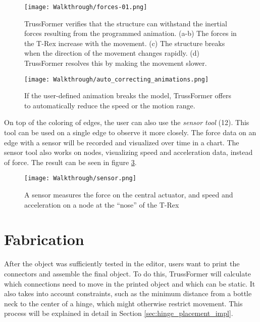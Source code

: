 \begin{figure}[ht!]
    \texttt{[image: Walkthrough/forces-01.png]}
    \centering
    \caption{TrussFormer verifies that the structure can withstand the inertial forces resulting from the programmed animation. (a-b) The forces in the T-Rex increase with the movement. (c) The structure breaks when the direction of the movement changes rapidly. (d) TrussFormer resolves this by making the movement slower.}
    \label{fig:fix_breaking}
\end{figure}
\begin{figure}[ht!]
    \texttt{[image: Walkthrough/auto\_correcting\_animations.png]}
    \centering
    \caption{If the user-defined animation breaks the model, TrussFormer offers to automatically reduce the speed or the motion range.}
    \label{fig:correcting_animation}
\end{figure}

On top of the coloring of edges, the user can also use the \textit{sensor tool} (12). This tool can be used on a single edge to observe it more closely. The force data on an edge with a sensor will be recorded and visualized over time in a chart. The sensor tool also works on nodes, visualizing speed and acceleration data, instead of force. The result can be seen in figure \ref{fig:sensor}.\\
\begin{figure}[ht!]
    \texttt{[image: Walkthrough/sensor.png]}
    \centering
    \caption{A sensor measures the force on the central actuator, and speed and acceleration on a node at the ``nose'' of the T-Rex}
    \label{fig:sensor}
\end{figure}

\section{Fabrication}
After the object was sufficiently tested in the editor, users want to print the connectors and assemble the final object. To do this, TrussFormer will calculate which connections need to move in the printed object and which can be static. It also takes into account constraints, such as the minimum distance from a bottle neck to the center of a hinge, which might otherwise restrict movement. This process will be explained in detail in Section \ref{sec:hinge_placement_impl}.

